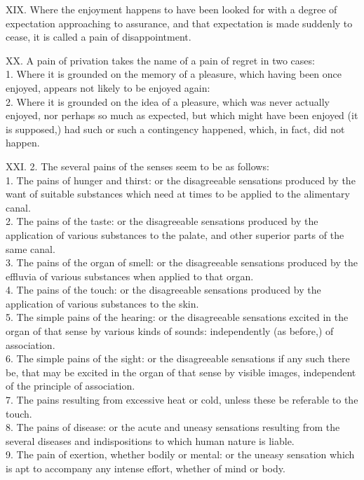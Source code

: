 \documentclass[12pt]{report}
\begin{document}
XIX. Where the enjoyment happens to have been looked for with a degree
of expectation approaching to assurance, and that expectation is made
suddenly to cease, it is called a pain of disappointment.

XX. A pain of privation takes the name of a pain of regret in two
cases:\\
1. Where it is grounded on the memory of a pleasure, which having been
once enjoyed, appears not likely to be enjoyed again:\\
2. Where it is grounded on the idea of a pleasure, which was never
actually enjoyed, nor perhaps so much as expected, but which might have
been enjoyed (it is supposed,) had such or such a contingency happened,
which, in fact, did not happen.

XXI. 2. The several pains of the senses seem to be as follows:\\
1. The pains of hunger and thirst: or the disagreeable sensations
produced by the want of suitable substances which need at times to be
applied to the alimentary canal.\\
2. The pains of the taste: or the disagreeable sensations produced by
the application of various substances to the palate, and other superior
parts of the same canal.\\
3. The pains of the organ of smell: or the disagreeable sensations
produced by the effluvia of various substances when applied to that
organ.\\
4. The pains of the touch: or the disagreeable sensations produced by
the application of various substances to the skin.\\
5. The simple pains of the hearing: or the disagreeable sensations
excited in the organ of that sense by various kinds of sounds:
independently (as before,) of association.\\
6. The simple pains of the sight: or the disagreeable sensations if any
such there be, that may be excited in the organ of that sense by visible
images, independent of the principle of association.\\
7. The pains resulting from excessive heat or cold, unless these be
referable to the touch.\\
8. The pains of disease: or the acute and uneasy sensations resulting
from the several diseases and indispositions to which human nature is
liable.\\
9. The pain of exertion, whether bodily or mental: or the uneasy
sensation which is apt to accompany any intense effort, whether of mind
or body.
\end{document}
